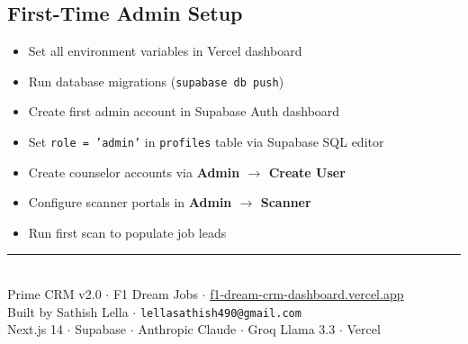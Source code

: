 \documentclass[11pt, a4paper]{article}
\newcommand{\nav}[1]{\textbf{\textcolor{accent}{#1}}}
\begin{document}
\subsection{First-Time Admin Setup}

\begin{itemize}[label=$\square$]
  \item Set all environment variables in Vercel dashboard
  \item Run database migrations (\texttt{supabase db push})
  \item Create first admin account in Supabase Auth dashboard
  \item Set \texttt{role = 'admin'} in \texttt{profiles} table via Supabase SQL editor
  \item Create counselor accounts via \nav{Admin $\rightarrow$ Create User}
  \item Configure scanner portals in \nav{Admin $\rightarrow$ Scanner}
  \item Run first scan to populate job leads
\end{itemize}

\vfill
\begin{center}
\textcolor{border}{\rule{0.8\linewidth}{0.4pt}}\\[0.5em]
\small\textcolor{secondary}{
  Prime CRM v2.0 $\cdot$ F1 Dream Jobs $\cdot$ \href{https://f1-dream-crm-dashboard.vercel.app/}{f1-dream-crm-dashboard.vercel.app}\\
  Built by Sathish Lella $\cdot$ \texttt{lellasathish490@gmail.com}\\[0.3em]
  Next.js 14 $\cdot$ Supabase $\cdot$ Anthropic Claude $\cdot$ Groq Llama 3.3 $\cdot$ Vercel
}
\end{center}
\end{document}

